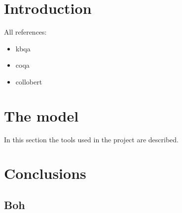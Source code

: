 \documentclass[12pt,a4paper,hidelinks]{article}
\begin{document}

\tableofcontents
\thispagestyle{empty}
\newpage
\setcounter{page}{1}


\section{Introduction}\label{sec:intro}

All references:
\begin{itemize}
  \item kbqa~\cite{kbqa}    
  \item coqa~\cite{coqa}
  \item collobert~\cite{Collobert}
\end{itemize}

\section{The model}\label{sec:model}
In this section the tools used in the project are described.

\section{Conclusions}\label{sec:conclusions}

\subsection{Boh}



\end{document}
